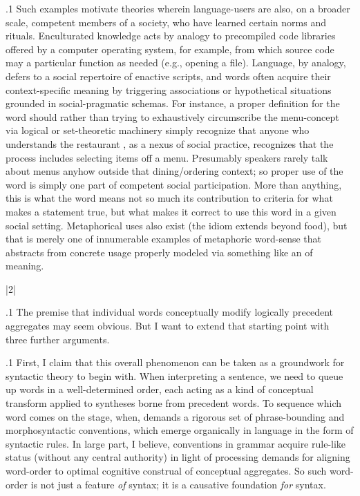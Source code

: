 \documentclass[11pt, twocolumn]{article}
\begin{document}
\p.1{%
Such examples motivate theories wherein language-users are
also, on a broader scale, competent members of a society, who
have learned certain norms and rituals.  Enculturated
knowledge acts by analogy to precompiled code libraries offered
by a computer operating system, for example, from which source code
may  a particular function as needed (e.g., opening
a file).  Language, by analogy, defers to a social repertoire of
enactive scripts, and words often acquire their context-specific
meaning by triggering associations \mdash{} or hypothetical
situations \mdash{} grounded in social-pragmatic schemas.  For instance,
a proper definition for the word  should \mdash{} rather than
trying to exhaustively circumscribe the menu-concept via
logical or set-theoretic machinery \mdash{} simply recognize that
anyone who understands the restaurant , as a nexus
of social practice, recognizes that the process includes
selecting items off a menu.  Presumably speakers rarely talk about
menus anyhow outside that dining/ordering context; so proper use
of the word is simply one part of competent social participation.
More than anything, this is what the word means \mdash{} not so
much its contribution to criteria for what makes a statement true,
but what makes it correct to use this word in a given social setting.
Metaphorical uses also exist (the idiom 
extends beyond food), but that is merely one of innumerable examples
of metaphoric word-sense that abstracts from concrete
 usage properly modeled via something like an
 of meaning.
} %


\s|2|{}

\p.1{%
The premise that individual words conceptually modify logically
precedent aggregates may seem obvious.  But I want to extend that
starting point with three further arguments.
} %

\p.1{%
First, I claim that this overall phenomenon can be taken as a
groundwork for syntactic theory to begin with.
When interpreting a sentence, we need to queue up words
in a well-determined order, each acting as a
kind of conceptual transform applied to
syntheses borne from precedent words.  To sequence
which word comes on the stage, when, demands a
rigorous set of phrase-bounding and morphosyntactic
conventions, which emerge organically in
language in the form of syntactic rules.
In large part, I believe, conventions in grammar
acquire rule-like status (without any central authority)
in light of processing demands for aligning 
word-order to optimal cognitive construal of conceptual
aggregates.  So such word-order is not just a feature
\textit{of} syntax; it is a causative foundation \textit{for} syntax.
} %
\end{document}
